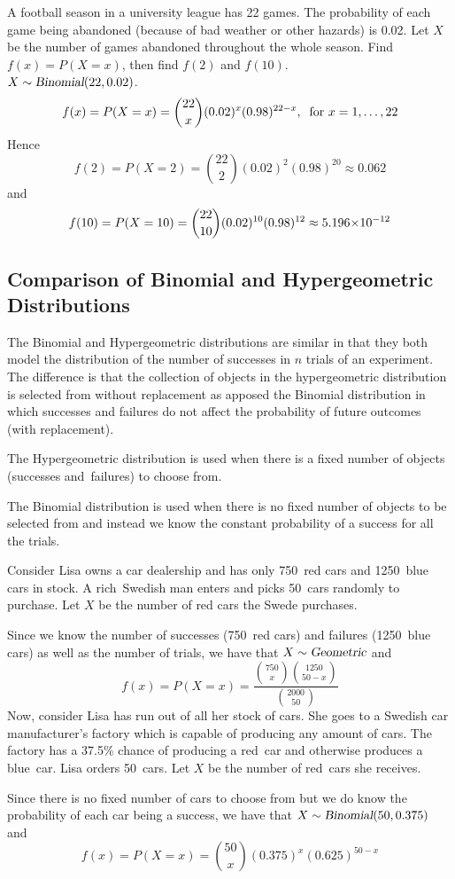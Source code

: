 \begin{example}
A football season in a university league has 22 games. The probability of each game being abandoned (because of bad weather or other hazards) is 0.02. Let $X$ be the number of games abandoned throughout the whole season. Find $f(x)=P(X=x)$, then find $f(2)$ and $f(10)$. \\
$X\sim\operatorname{\textsl{Binomial}}(22,0.02)$.
\[
    f(x) = P(X = x) = \displaystyle\binom{22}{x} (0.02)^x (0.98)^{22-x},\:\text{ for } x = 1,\ldots,22
\]
Hence 
\[
    f(2) = P(X = 2) = \displaystyle\binom{22}{2} (0.02)^2 (0.98)^20 \approx 0.062
\]
and 
\[
    f(10) = P(X = 10) = \displaystyle\binom{22}{10} (0.02)^{10} (0.98)^{12} \approx {5.196}{\times}10^{-12}
\]
\end{example}
\subsection{Comparison of Binomial and Hypergeometric Distributions}
The Binomial and Hypergeometric distributions are similar in that they both model the distribution of the number of successes in $n$ trials of an experiment. The difference is that the collection of objects in the hypergeometric distribution is selected from without replacement as apposed the Binomial distribution in which successes and failures do not affect the probability of future outcomes (with replacement).
\begin{info}
The Hypergeometric distribution is used when there is a fixed number of objects (successes and~failures) to choose from.
\par\smallskip
The Binomial distribution is used when there is no fixed number of objects to be selected from and instead we know the constant probability of a success for all the trials.
\end{info}
\begin{example}
Consider Lisa owns a car dealership and has only 750~red cars and 1250~blue cars in stock. A rich~Swedish man enters and picks 50~cars randomly to purchase. Let $X$ be the number of red cars the Swede purchases.
\par\smallskip
Since we know the number of successes (750~red cars) and failures (1250~blue cars) as well as the number of trials, we have that $X \sim \operatorname{\textsl{Geometric}}$ and 
\[
    f(x) = P(X = x) = \frac{\binom{750}{x} \binom{1250}{50-x}}{\binom{2000}{50}}
\]
Now, consider Lisa has run out of all her stock of cars. She goes to a Swedish car manufacturer's factory which is capable of producing any amount of cars. The factory has a 37.5\% chance of producing a red~car and otherwise produces a blue~car. Lisa orders 50~cars. Let $X$ be the number of red~cars she receives.
\par\smallskip
Since there is no fixed number of cars to choose from but we do know the probability of each car being a success, we have that $X \sim \operatorname{\textsl{Binomial}}(50, 0.375)$ and
\[
    f(x) = P(X = x) = \binom{50}{x} (0.375)^{x} (0.625)^{50-x}
\]
\end{example}
